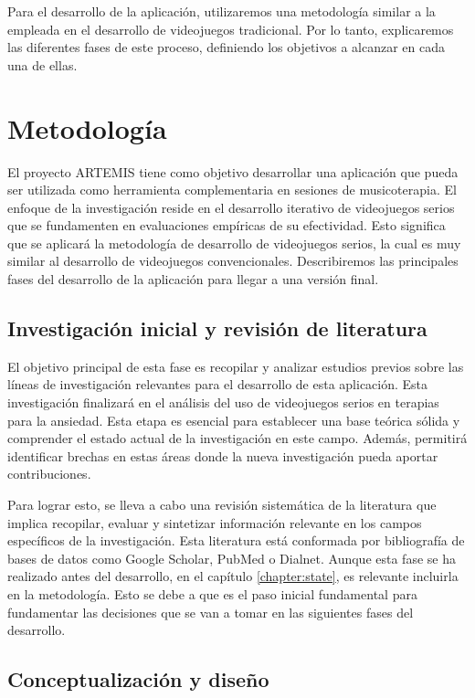 Para el desarrollo de la aplicación, utilizaremos una metodología similar a la empleada en el desarrollo de videojuegos tradicional. Por lo tanto, explicaremos las diferentes fases de este proceso, definiendo los objetivos a alcanzar en cada una de ellas.

\section{Metodología}

El proyecto ARTEMIS tiene como objetivo desarrollar una aplicación que pueda ser utilizada como herramienta complementaria en sesiones de musicoterapia. El enfoque de la investigación reside en el desarrollo iterativo de videojuegos serios que se fundamenten en evaluaciones empíricas de su efectividad. Esto significa que se aplicará la metodología de desarrollo de videojuegos serios, la cual es muy similar al desarrollo de videojuegos convencionales. Describiremos las principales fases del desarrollo de la aplicación para llegar a una versión final.

\subsection{Investigación inicial y revisión de literatura}

El objetivo principal de esta fase es recopilar y analizar estudios previos sobre las líneas de investigación relevantes para el desarrollo de esta aplicación. Esta investigación finalizará en el análisis del uso de videojuegos serios en terapias para la ansiedad. Esta etapa es esencial para establecer una base teórica sólida y comprender el estado actual de la investigación en este campo. Además, permitirá identificar brechas en estas áreas donde la nueva investigación pueda aportar contribuciones.

Para lograr esto, se lleva a cabo una revisión sistemática de la literatura que implica recopilar, evaluar y sintetizar información relevante en los campos específicos de la investigación. Esta literatura está conformada por bibliografía de bases de datos como Google Scholar, PubMed o Dialnet. Aunque esta fase se ha realizado antes del desarrollo, en el capítulo \ref{chapter:state}, es relevante incluirla en la metodología. Esto se debe a que es el paso inicial fundamental para fundamentar las decisiones que se van a tomar en las siguientes fases del desarrollo.

\subsection{Conceptualización y diseño}

